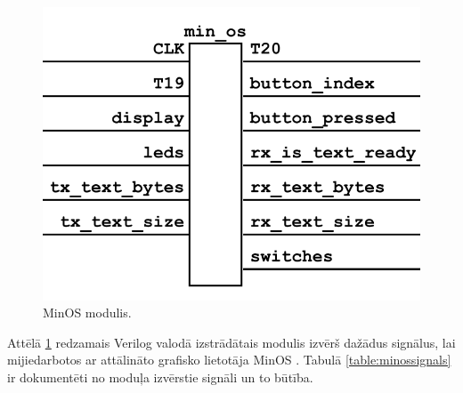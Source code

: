 \begin{figure}[H]
    \includegraphics[width=0.7\linewidth]{assets/min-os-grey.png}
    \centering
    \caption{MinOS  modulis.}
    \label{fig:minos}
\end{figure}

Attēlā \ref{fig:minos} redzamais Verilog valodā izstrādātais modulis izvērš
dažādus signālus, lai mijiedarbotos ar attālināto grafisko lietotāja MinOS
. Tabulā \ref{table:minossignals} ir dokumentēti
no moduļa izvērstie signāli un to būtība.

